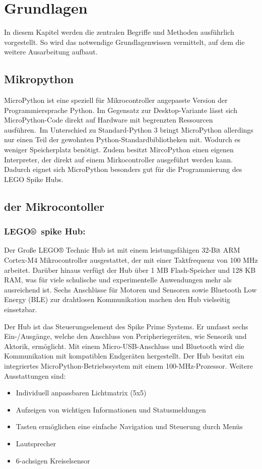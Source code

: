 \chapter{Grundlagen}
In diesem Kapitel werden die zentralen Begriffe und Methoden ausführlich vorgestellt. So wird das notwendige Grundlagenwissen vermittelt, auf dem die weitere Ausarbeitung aufbaut.

\section{Mikropython}
MicroPython ist eine speziell für Mikrocontroller angepasste Version der Programmiersprache Python. Im Gegensatz zur Desktop-Variante lässt sich MicroPython-Code direkt auf Hardware mit begrenzten Ressourcen ausführen.\autocite{energy_responsiveness2023}\autocite{Plauska2023}\
Im Unterschied zu Standard-Python 3 bringt MicroPython allerdings nur einen Teil der gewohnten Python-Standardbibliotheken mit. Wodurch es weniger Speicherplatz benötigt.
Zudem besitzt MircoPython einen eigenen Interpreter, der direkt auf einem Mirkocontroller ausgeführt werden kann.
Dadurch eignet sich MicroPython besonders gut für die Programmierung des LEGO Spike Hubs.\autocite{bell2024micropython}



\section{der Mikrocontoller}
\subsection*{LEGO® spike Hub:}
Der Große LEGO® Technic Hub ist mit einem leistungsfähigen 32-Bit ARM Cortex-M4 Mikrocontroller ausgestattet, der mit einer Taktfrequenz von 100 MHz arbeitet. Darüber hinaus verfügt der Hub über 1 MB Flash-Speicher und 128 KB RAM, was für viele schulische und experimentelle Anwendungen mehr als ausreichend ist. Sechs Anschlüsse für Motoren und Sensoren sowie Bluetooth Low Energy (BLE) zur drahtlosen Kommunikation machen den Hub vielseitig einsetzbar.

Der Hub ist das Steuerungselement des Spike Prime Systems. Er umfasst sechs Ein-/Ausgänge, welche den Anschluss von Peripheriegeräten, wie Sensorik und Aktorik, ermöglicht. Mit einem Micro-USB-Anschluss und Bluetooth wird die Kommunikation mit kompatiblen Endgeräten hergestellt. Der Hub besitzt ein integriertes MicroPython-Betriebssystem mit einem 100-MHz-Prozessor. 
Weitere Ausstattungen sind:
\begin{itemize}
	\item Individuell anpassbaren Lichtmatrix (5x5)
	\item Aufzeigen von wichtigen Informationen und Statusmeldungen
	\item Tasten ermöglichen eine einfache Navigation und Steuerung durch Menüs 
	\item Lautsprecher
	\item 6-achsigen Kreiselsensor
\end{itemize}

